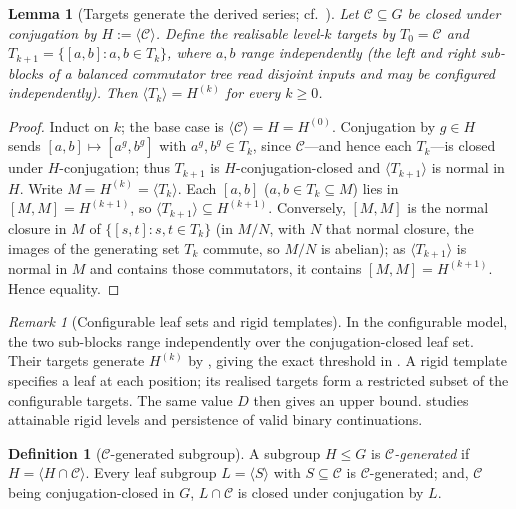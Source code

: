 \documentclass[11pt]{amsart}
\newtheorem{lemma}[lemma]{Lemma}
\theoremstyle{definition}
\newtheorem{definition}[definition]{Definition}
\theoremstyle{remark}
\newtheorem{remark}[remark]{Remark}
\theoremstyle{plain}
\theoremstyle{plain}
\numberwithin{equation}{section}
\begin{document}
\begin{lemma}[Targets generate the derived series; cf.~\cite{FernandezPintonello2023}]
\label{lem:central}
Let $\mathcal{C}\subseteq G$ be closed under conjugation by $H:=\langle\mathcal{C}\rangle$.
Define the realisable level-$k$ targets by $T_0=\mathcal{C}$ and
$T_{k+1}=\{[a,b]:a,b\in T_k\}$, where $a,b$ range independently (the left and right
sub-blocks of a balanced commutator tree read disjoint inputs and may be configured
independently). Then $\langle T_k\rangle=H^{(k)}$ for every $k\ge0$.
\end{lemma}
\begin{proof}
Induct on $k$; the base case is $\langle\mathcal{C}\rangle=H=H^{(0)}$. Conjugation by
$g\in H$ sends $[a,b]\mapsto[a^g,b^g]$ with $a^g,b^g\in T_k$, since $\mathcal{C}$---and
hence each $T_k$---is closed under $H$-conjugation; thus $T_{k+1}$ is
$H$-conjugation-closed and $\langle T_{k+1}\rangle$ is normal in $H$. Write
$M=H^{(k)}=\langle T_k\rangle$. Each $[a,b]$ ($a,b\in T_k\subseteq M$) lies in
$[M,M]=H^{(k+1)}$, so $\langle T_{k+1}\rangle\subseteq H^{(k+1)}$. Conversely, $[M,M]$ is
the normal closure in $M$ of $\{[s,t]:s,t\in T_k\}$ (in $M/N$, with $N$ that normal
closure, the images of the generating set $T_k$ commute, so $M/N$ is abelian); as
$\langle T_{k+1}\rangle$ is normal in $M$ and contains those commutators, it contains
$[M,M]=H^{(k+1)}$. Hence equality.
\end{proof}

\begin{remark}[Configurable leaf sets and rigid templates]
\label{rem:configurable}
In the configurable model, the two sub-blocks range independently over
the conjugation-closed leaf set. Their targets generate $H^{(k)}$ by
, giving the exact threshold in .
A rigid template specifies a leaf at each position; its realised targets
form a restricted subset of the configurable targets. The same value $D$
then gives an upper bound.  studies attainable rigid
levels and persistence of valid binary continuations.
\end{remark}

\begin{definition}[$\mathcal{C}$-generated subgroup]
\label{def:cgen}
A subgroup $H\le G$ is \emph{$\mathcal{C}$-generated} if $H=\langle H\cap\mathcal{C}\rangle$.
Every leaf subgroup $L=\langle S\rangle$ with $S\subseteq\mathcal{C}$ is
$\mathcal{C}$-generated; and, $\mathcal{C}$ being conjugation-closed in $G$,
$L\cap\mathcal{C}$ is closed under conjugation by $L$.
\end{definition}
\end{document}
